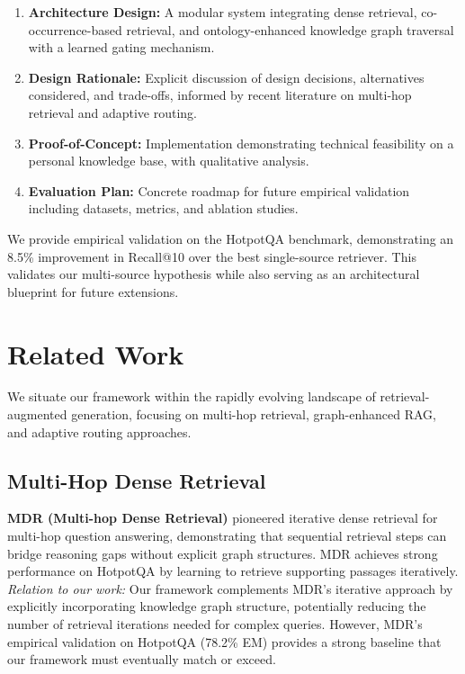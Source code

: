 \documentclass[11pt,a4paper]{article}
\begin{document}
\begin{enumerate}
    \item \textbf{Architecture Design:} A modular system integrating dense retrieval, co-occurrence-based retrieval, and ontology-enhanced knowledge graph traversal with a learned gating mechanism.
    
    \item \textbf{Design Rationale:} Explicit discussion of design decisions, alternatives considered, and trade-offs, informed by recent literature on multi-hop retrieval and adaptive routing.
    
    \item \textbf{Proof-of-Concept:} Implementation demonstrating technical feasibility on a personal knowledge base, with qualitative analysis.
    
    \item \textbf{Evaluation Plan:} Concrete roadmap for future empirical validation including datasets, metrics, and ablation studies.
\end{enumerate}

We provide empirical validation on the HotpotQA benchmark, demonstrating an 8.5\% improvement in Recall@10 over the best single-source retriever. This validates our multi-source hypothesis while also serving as an architectural blueprint for future extensions.

\section{Related Work}
\label{sec:related_work}

We situate our framework within the rapidly evolving landscape of retrieval-augmented generation, focusing on multi-hop retrieval, graph-enhanced RAG, and adaptive routing approaches.

\subsection{Multi-Hop Dense Retrieval}

\textbf{MDR (Multi-hop Dense Retrieval)} \citep{xiong2021answering} pioneered iterative dense retrieval for multi-hop question answering, demonstrating that sequential retrieval steps can bridge reasoning gaps without explicit graph structures. MDR achieves strong performance on HotpotQA by learning to retrieve supporting passages iteratively. \textit{Relation to our work:} Our framework complements MDR's iterative approach by explicitly incorporating knowledge graph structure, potentially reducing the number of retrieval iterations needed for complex queries. However, MDR's empirical validation on HotpotQA (78.2\% EM) provides a strong baseline that our framework must eventually match or exceed.
\end{document}

